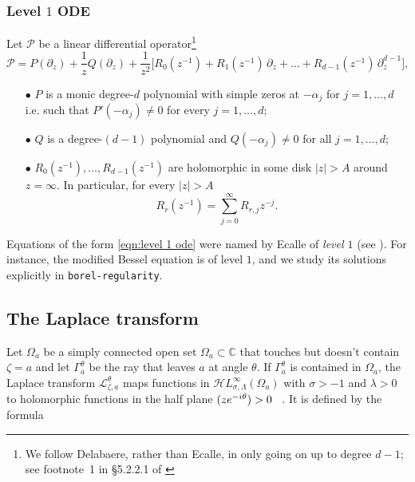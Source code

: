 \documentclass{article}
\theoremstyle{plain}
\newcommand{\C}{\mathbb{C}}
\let\Re\relax
\DeclareMathOperator{\Re}{Re}
\newcommand{\laplace}{\mathcal{L}}
\newcommand{\singexp}[2]{\mathcal{H}L^\infty_{#1, #2}}
\begin{document}
\subsubsection{Level $1$ ODE}\label{sec:level 1 ODE}

Let $\mathcal{P}$ be a linear differential operator\footnote{ We follow Delabaere, rather than Ecalle, in only going on up to degree $d-1$; see footnote~1 in \S 5.2.2.1 of \cite{diverg-resurg-iii}}
\begin{equation}\label{eqn:level 1 ode}
\mathcal{P} = P(\partial_z) + \frac{1}{z} Q(\partial_z) + \frac{1}{z^2}\big[ R_0(z^{-1}) + R_1(z^{-1})\,\partial_z + \ldots + R_{d-1}(z^{-1})\,\partial_z^{d-1} \big],
\end{equation}

\begin{enumerate}
\item[$\bullet$] $P$ is a monic degree-$d$ polynomial with simple zeros at $-\alpha_j$ for $j=1,...,d$ i.e. such that $P'(-\alpha_j)\neq 0$ for every $j=1,...,d$; 
\item[$\bullet$] $Q$ is a degree-$(d-1)$ polynomial and $Q(-\alpha_j)\neq 0$ for all $j=1,...,d$;
\item[$\bullet$] $R_0(z^{-1}), \ldots, R_{d-1}(z^{-1})$ are holomorphic in some disk $|z| > A$ around $z = \infty$. In particular, for every $|z|>A$
\[ R_r(z^{-1}) = \sum_{j=0}^\infty R_{r,j} z^{-j}. \]
\end{enumerate}

Equations of the form \eqref{eqn:level 1 ode} were named by Ecalle of \textit{level $1$} (see \cite[Section 2.1]{EcalleIII}). For instance, the modified Bessel equation is of level $1$, and we study its solutions explicitly in {\tt borel-regularity}. 

\subsection{The Laplace transform}


Let $\Omega_{a}$ be a simply connected open set $\Omega_a\subset\C$ that touches but doesn't contain $\zeta=a$ and let $\Gamma_a^\theta$ be the ray that leaves $a$ at angle $\theta$. If $\Gamma_a^\theta$ is contained in $\Omega_a$, the Laplace transform $\laplace_{\zeta, a}^{\theta} $ maps functions in $\singexp{\sigma}{\Lambda}(\Omega_a)$ with $\sigma>-1$ and $\lambda>0$ to holomorphic functions in the half plane $\Re(z e^{-i\theta}) > 0$ ~\cite[Section 5.6]{diverg-resurg-i}. It is defined by the formula
\end{document}
